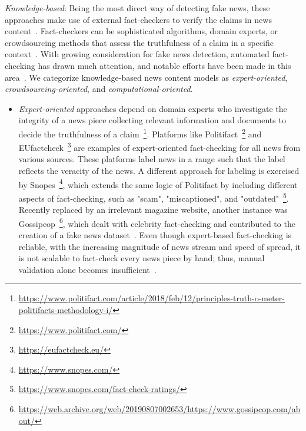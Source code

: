 \begin{description}
    \item{\emph{Knowledge-based}}: Being the most direct way of detecting fake news, these approaches make use of external fact-checkers to verify the claims in news content~\parencite{FakeNewsDetectionOnSocialMediaADataMiningPerspective_Shu}. Fact-checkers can be sophisticated algorithms, domain experts, or crowdsourcing methods that assess the truthfulness of a claim in a specific context~\parencite{FactChecking_Vlachos}. With growing consideration for fake news detection, automated fact-checking has drawn much attention, and notable efforts have been made in this area~\parencite{AutomatedFactChecking_Thorne, OverviewOfCheckThat_Barroncede}. We categorize knowledge-based news content models as \emph{expert-oriented}, \emph{crowdsourcing-oriented}, and \emph{computational-oriented}.
    \begin{itemize}
        \item \emph{Expert-oriented} approaches depend on domain experts who investigate the integrity of a news piece collecting relevant information and documents to decide the truthfulness of a claim~\footnote{\url{https://www.politifact.com/article/2018/feb/12/principles-truth-o-meter-politifacts-methodology-i/}}. Platforms like Politifact~\footnote{\url{https://www.politifact.com/}} and EUfactcheck~\footnote{\url{https://eufactcheck.eu/}} are examples of expert-oriented fact-checking for all news from various sources. These platforms label news in a range such that the label reflects the veracity of the news. A different approach for labeling is exercised by Snopes~\footnote{\url{https://www.snopes.com/}}, which extends the same logic of Politifact by including different aspects of fact-checking, such as "scam", "miscaptioned", and "outdated"~\footnote{\url{https://www.snopes.com/fact-check-ratings/}}. Recently replaced by an irrelevant magazine website, another instance was Gossipcop~\footnote{\url{https://web.archive.org/web/20190807002653/https://www.gossipcop.com/about/}}, which dealt with celebrity fact-checking and contributed to the creation of a fake news dataset~\parencite{FakeNewsNet_Shu}. Even though expert-based fact-checking is reliable, with the increasing magnitude of news stream and speed of spread, it is not scalable to fact-check every news piece by hand; thus, manual validation alone becomes insufficient~\parencite{ASurveyOnAutomatedFactChecking_Guo}.

\end{itemize}
\end{description}
